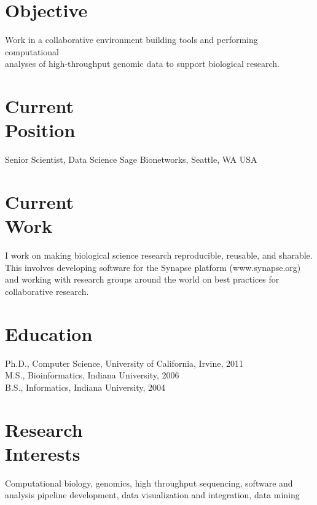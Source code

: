 \documentclass[margin,line]{res}
\begin{document}
\address{\textbf{E-mail:} kenny@kennydaily.net \textbf{Web:} www.kennydaily.net}
\address{810 Taylor Ave N Apt 328, Seattle, WA 98109}

\begin{resume}


\section{\sc Objective}
Work in a collaborative environment building tools and performing computational\\
analyses of high-throughput genomic data to support biological research.

\section{\sc Current\\Position}
Senior Scientist, Data Science
Sage Bionetworks, Seattle, WA USA

\section{\sc Current\\Work}
I work on making biological science research reproducible, reusable,
and sharable. This involves developing software for the Synapse
platform (www.synapse.org) and working with research groups around the
world on best practices for collaborative research.

\section{\sc Education}
Ph.D., Computer Science, University of California, Irvine, 2011\\%
M.S., Bioinformatics, Indiana University, 2006\\%
B.S., Informatics, Indiana University, 2004%

\section{\sc Research\\Interests}
Computational biology, genomics, high throughput sequencing, software
and analysis pipeline development, data visualization and integration,
data mining


\end{resume}
\end{document}
